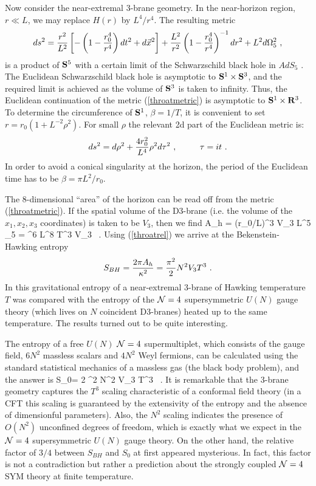 \documentclass[12pt]{article}
\begin{document}
Now consider the near-extremal 3-brane geometry. In the near-horizon region,
$r \ll L$, we may replace $H(r)$ by $L^4/r^4$. 
The resulting metric 
\begin{equation}
\label{throatmetric}
   ds^2 = {r^2 \over L^2} 
    \left[ -  \left (1- {r_0^4\over r^4} \right )
dt^2 + d\vec{x}^2 \right] +
    {L^2 \over r^2} 
  \left  ( 1- {r_0^4\over r^4} \right )^{-1}  dr^2 + L^2 d\Omega_5^2 \ ,
\end{equation}
is a product of ${\bf S}^5$  with  a  certain
limit of the Schwarzschild black hole in $AdS_5$
 \cite{newWit}. The Euclidean Schwarzschild black hole is asymptotic to
${\bf S}^1\times {\bf S}^3$, and the required limit is 
achieved as the volume of
${\bf S}^3$ is taken to infinity. Thus, the Euclidean continuation of
the metric (\ref{throatmetric}) is asymptotic to 
${\bf S}^1\times {\bf R}^3$. 
To determine the circumference
of ${\bf S}^1$, $\beta=1/T$, it is convenient 
to set $r= r_0(1  + L^{-2} \rho^2)$. For small $\rho$ 
the relevant 2d  part of the Euclidean  metric is:
\begin{equation}
ds^2 = d\rho^2 + {4r_0^2\ov L^4} \rho^2 d\tau^2\ , \ \  \qquad \tau=it \ .
\end{equation}
In order to avoid a conical singularity at the horizon,
the period of the Euclidean time
has to be $\beta = \pi L^2/r_0$.

The 8-dimensional ``area'' of the horizon can be read off from the
metric (\ref{throatmetric}). If the spatial volume of the D3-brane (i.e.
the volume of the $x_1, x_2, x_3$ coordinates) is taken to be $V_3$,
then we find
\be
A_h = (r_0/L)^3 V_3 L^5 \Omega_5 = \pi^6 L^8 T^3 V_3 \ .
\ee 
Using (\ref{throatrel}) we arrive at the Bekenstein-Hawking
entropy \cite{gkp}
\begin{equation}
\label{bhe}
S_{BH}= {2\pi A_h\over \kappa^2} = {\pi^2\over 2} N^2 V_3 T^3
\ .
\end{equation}
In \cite{gkp} this gravitational entropy of a near-extremal
3-brane of Hawking temperature $T$ was compared with the entropy
of the ${\cal N}=4$ supersymmetric $U(N)$ gauge theory (which lives
on $N$ coincident D3-branes) heated up to the same temperature. 
The results turned out to be quite interesting.

The entropy of a free $U(N)$ ${\cal N}=4$
supermultiplet, which consists of the gauge field, $6 N^2$ massless
scalars and $4 N^2$ Weyl fermions, can be calculated using
the standard statistical mechanics of a massless gas (the black body 
problem), and the answer is
\be \label{ffc}
S_0= {2 \pi^2} N^2 V_3 T^3
\ .
\ee
It is remarkable that the 3-brane geometry
captures the $T^3$ scaling characteristic of a conformal
field theory (in a CFT this scaling is guaranteed by the extensivity of
the entropy and the absence of dimensionful parameters).
Also, the $N^2$ scaling indicates the presence of $O(N^2)$
unconfined degrees of freedom, which is exactly what we expect in
the ${\cal N}=4$ supersymmetric $U(N)$ gauge theory.
On the other hand, the relative factor of $3/4$ between $S_{BH}$ and
$S_0$ at first appeared mysterious.
In fact, this factor
is not a contradiction but rather a prediction about the strongly
coupled ${\cal N}=4$ SYM theory at finite temperature. 
\end{document}
